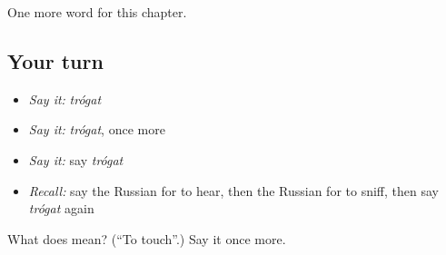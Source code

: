 \begin{grammarlens}[title={What you've built}]
One more word for this chapter.
\end{grammarlens}

\subsection*{Your turn}
\begin{itemize}
\raggedright
  \item \emph{Say it:} \emph{trógat}
  \item \emph{Say it:} \emph{trógat}, once more
  \item \emph{Say it:} say \emph{trógat}
  \item \emph{Recall:} say the Russian for to hear, then the Russian for to sniff, then say \emph{trógat} again
\end{itemize}

\begin{tcolorbox}[breakable,colback=teal!4,colframe=teal!35!black,title={Before you move on}]
What does  mean? (\textquotedblleft{}To touch\textquotedblright{}.) Say it once more.
\end{tcolorbox}
